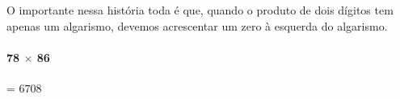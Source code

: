 \documentclass[12pt]{book}
\begin{document}
\vspace{0.25cm}
\begin{minipage}{0.4\textwidth}
\end{minipage}%
%
\begin{minipage}{0.3\textwidth}
\end{minipage}%
%
\begin{minipage}{0.3\textwidth}
\end{minipage}

O importante nessa história toda é
que, quando o produto de dois dígitos
tem apenas um algarismo, devemos acrescentar
um zero à esquerda do algarismo.








\paragraph{78 $\times$ 86}= $6708$\\
\end{document}

